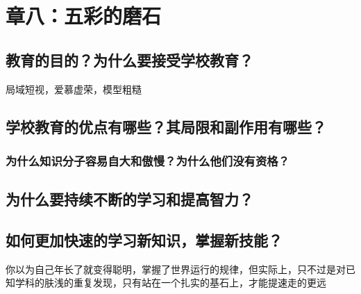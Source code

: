 \chapter{章八：五彩的磨石}

\section{教育的目的？为什么要接受学校教育？}
局域短视，爱慕虚荣，模型粗糙
\section{学校教育的优点有哪些？其局限和副作用有哪些？}
\subsection*{为什么知识分子容易自大和傲慢？为什么他们没有资格？}
\section{为什么要持续不断的学习和提高智力？}
\section{如何更加快速的学习新知识，掌握新技能？}

你以为自己年长了就变得聪明，掌握了世界运行的规律，但实际上，只不过是对已知学科的肤浅的重复发现，只有站在一个扎实的基石上，才能提速走的更远
